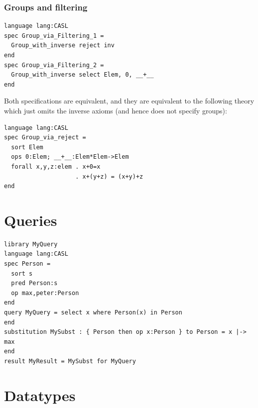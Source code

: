 \documentclass[10pt,fleqn,final]{scrreprt}
\newcommand{\sclause}[1]{\section{#1}}
\newcommand{\sssclause}[1]{\subsubsection{#1}}
\begin{document}
\sssclause{Groups and filtering}
\begin{lstlisting}[basicstyle=\ttfamily,language=dolText,morekeywords={props,ObjectProperty,Class,DisjointUnionOf,SubClassOf,Characteristics,Transitive,Asymmetric,SubPropertyOf,DisjointClasses,EquivalentTo,inverse,only,forall,iff,if,or,exists,sort,ops,spec,forget},escapechar=@,mathescape]
language lang:CASL
spec Group_via_Filtering_1 =
  Group_with_inverse reject inv
end
spec Group_via_Filtering_2 =
  Group_with_inverse select Elem, 0, __+__
end
\end{lstlisting}
Both specifications are equivalent, and they are equivalent 
to the following theory which just omits the inverse
axioms (and hence does not specify groups):
\begin{lstlisting}[basicstyle=\ttfamily,language=dolText,morekeywords={props,ObjectProperty,Class,DisjointUnionOf,SubClassOf,Characteristics,Transitive,Asymmetric,SubPropertyOf,DisjointClasses,EquivalentTo,inverse,only,forall,iff,if,or,exists,sort,ops,spec,forget},escapechar=@,mathescape]
language lang:CASL
spec Group_via_reject =
  sort Elem
  ops 0:Elem; __+__:Elem*Elem->Elem
  forall x,y,z:elem . x+0=x
                    . x+(y+z) = (x+y)+z
end
\end{lstlisting}





\sclause{Queries}
\begin{lstlisting}[basicstyle=\ttfamily,language=dolText,morekeywords={props,ObjectProperty,Class,DisjointUnionOf,SubClassOf,Characteristics,Transitive,Asymmetric,SubPropertyOf,DisjointClasses,EquivalentTo,inverse,only,forall,iff,if,or,exists,query,select,where,in,substitution,result,for,along,library,spec,sort,pred,op},escapechar=@,mathescape]
%prefix( lang:  <http://purl.net/DOL/languages/> )%
library MyQuery
language lang:CASL
spec Person =
  sort s
  pred Person:s 
  op max,peter:Person
end
query MyQuery = select x where Person(x) in Person
end
substitution MySubst : { Person then op x:Person } to Person = x |-> max
end
result MyResult = MySubst for MyQuery
\end{lstlisting}

\sclause{Datatypes}
\end{document}
